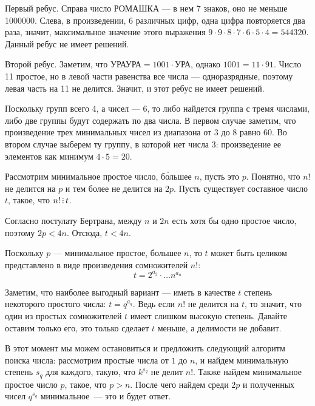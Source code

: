 ﻿
\begin{itemize}
\itA Первый ребус. Справа число РОМАШКА --- в нем 7 знаков, оно не меньше 1000000.
Слева, в произведении, 6 различных цифр, одна цифра повторяется два раза, значит, максимальное
значение этого выражения $9\cdot 9 \cdot 8 \cdot 7 \cdot 6 \cdot 5 \cdot 4 = 544320$.
Данный ребус не имеет решений.

Второй ребус. Заметим, что $\text{УРАУРА} = 1001 \cdot \text{УРА}$, однако $1001 = 11 \cdot 91$.
Число 11 простое, но в левой части равенства все числа --- одноразрядные, поэтому левая часть
на 11 не делится. Значит, и этот ребус не имеет решений.

\itB Поскольку групп всего 4, а чисел --- 6, то либо найдется группа с тремя числами, либо две
группы будут содержать по два числа. В первом случае заметим, что произведение трех минимальных
чисел из диапазона от 3 до 8 равно $60$. Во втором случае выберем ту группу, в которой нет 
числа 3: произведение ее элементов как минимум $4 \cdot 5 = 20$.

\itC Рассмотрим минимальное простое число, б\'ольшее $n$, пусть это $p$.
Понятно, что $n!$ не делится на $p$ и тем более не делится на $2p$. 
Пусть существует составное число $t$, такое, что $n! \divsby t$.

Согласно постулату Бертрана, между $n$ и $2n$ есть хотя бы одно простое число,
поэтому $2p < 4n$. Отсюда, $t < 4n$. 

Поскольку $p$ --- минимальное простое, большее $n$, то $t$ может быть целиком
представлено в виде произведения сомножителей $n!$: 
$$t = 2^{a_2} \cdot \ldots n^{a_n}$$

Заметим, что наиболее выгодный вариант --- иметь в качестве $t$ степень некоторого
простого числа: $t = q^{a_q}$. Ведь если $n!$ не делится на $t$, то значит, что один
из простых сомножителей $t$ имеет слишком высокую степень. Давайте оставим только его,
это только сделает $t$ меньше, а делимости не добавит.

В этот момент мы можем остановиться и предложить следующий алгоритм поиска 
числа: рассмотрим простые числа от $1$ до $n$, и найдем минимальную степень 
$s_q$ для каждого, такую, что $k^{s_q}$ не делит $n!$. Также найдем минимальное
простое число $p$, такое, что $p > n$. После чего найдем среди $2p$ и полученных
чисел $q^{s_q}$ минимальное~— это и будет ответ.



\end{itemize}
